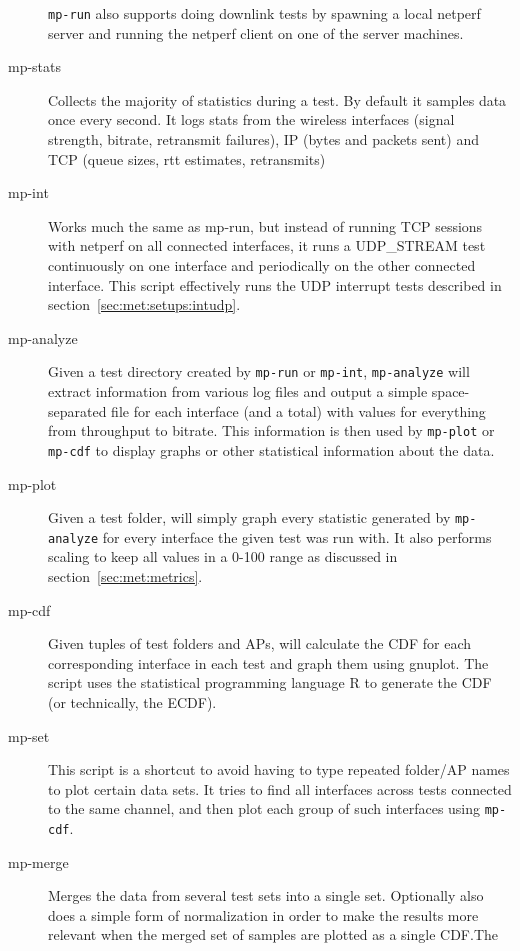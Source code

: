 \begin{description}
    \texttt{mp-run} also supports doing downlink tests by spawning a local
    netperf server and running the netperf client on one of the server machines.
  \item[mp-stats]
    Collects the majority of statistics during a test. By default it samples
    data once every second. It logs stats from the wireless interfaces (signal
    strength, bitrate, retransmit failures), IP (bytes and packets sent) and TCP
    (queue sizes, rtt estimates, retransmits)
  \item[mp-int]
    Works much the same as mp-run, but instead of running TCP sessions with
    netperf on all connected interfaces, it runs a UDP\_STREAM test continuously
    on one interface and periodically on the other connected interface. This
    script effectively runs the UDP interrupt tests described in
    section~\ref{sec:met:setups:intudp}.
  \item[mp-analyze]
    Given a test directory created by \texttt{mp-run} or \texttt{mp-int},
    \texttt{mp-analyze} will extract information from various log files and
    output a simple space-separated file for each interface (and a total) with
    values for everything from throughput to bitrate. This information is then
    used by \texttt{mp-plot} or \texttt{mp-cdf} to display graphs or other
    statistical information about the data.
  \item[mp-plot]
    Given a test folder, will simply graph every statistic generated by
    \texttt{mp-analyze} for every interface the given test was run with. It also
    performs scaling to keep all values in a 0-100 range as discussed in
    section~\ref{sec:met:metrics}.
  \item[mp-cdf]
    Given tuples of test folders and APs, will calculate the CDF for each
    corresponding interface in each test and graph them using gnuplot. The
    script uses the statistical programming language R to generate the CDF (or
    technically, the ECDF).
  \item[mp-set]
    This script is a shortcut to avoid having to type repeated folder/AP
    names to plot certain data sets. It tries to find all interfaces across
    tests connected to the same channel, and then plot each group of such
    interfaces using \texttt{mp-cdf}.
  \item[mp-merge]
    Merges the data from several test sets into a single set. Optionally also
    does a simple form of normalization in order to make the results more
    relevant when the merged set of samples are plotted as a single CDF.\@ The

\end{description}
